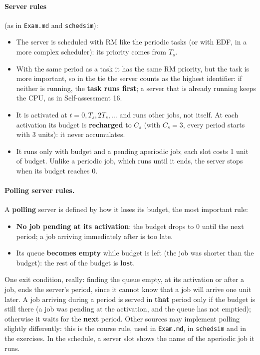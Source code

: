\paragraph{Server rules} (as in \texttt{Exam.md} and \texttt{schedsim}):
\begin{itemize}
    \item The server is scheduled with RM like the periodic tasks (or with EDF, in a more complex scheduler): its priority comes from $T_s$.
    \item With the same period as a task it has the same RM priority, but the task is more important, so in the tie the server counts as the highest identifier: if neither is running, the \textbf{task runs first}; a server that is already running keeps the CPU, as in Self-assessment 16.
    \item It is activated at $t = 0, T_s, 2T_s, \dots$ and runs other jobs, not itself. At each activation its budget is \textbf{recharged} to $C_s$ (with $C_s = 3$, every period starts with 3 units): it never accumulates.
    \item It runs only with budget and a pending aperiodic job; each slot costs 1 unit of budget. Unlike a periodic job, which runs until it ends, the server stops when its budget reaches 0.
\end{itemize}

\paragraph{Polling server rules.} A \textbf{polling} server is defined by how it loses its budget, the most important rule:
\begin{itemize}
    \item \textbf{No job pending at its activation}: the budget drops to 0 until the next period; a job arriving immediately after is too late.
    \item Its queue \textbf{becomes empty} while budget is left (the job was shorter than the budget): the rest of the budget is \textbf{lost}.
\end{itemize}
One exit condition, really: finding the queue empty, at its activation or after a job, ends the server's period, since it cannot know that a job will arrive one unit later. A job arriving during a period is served in \textbf{that} period only if the budget is still there (a job was pending at the activation, and the queue has not emptied); otherwise it waits for the \textbf{next} period. Other sources may implement polling slightly differently: this is the course rule, used in \texttt{Exam.md}, in \texttt{schedsim} and in the exercises. In the schedule, a server slot shows the name of the aperiodic job it runs.

